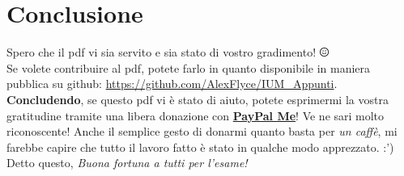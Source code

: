 \documentclass[oneside]{book}
\begin{document}
\chapter{Conclusione}
	Spero che il pdf vi sia servito e sia stato di vostro gradimento! \includegraphics[height = 3mm]{images/smile.png} \\

	Se volete contribuire al pdf, potete farlo in quanto disponibile in maniera pubblica su github: \url{https://github.com/AlexFlyce/IUM_Appunti}. \\


	\textbf{Concludendo}, se questo pdf vi è stato di aiuto, potete esprimermi la vostra gratitudine tramite una libera donazione con \href{https://www.paypal.me/alexflyce}{\textbf{PayPal Me}}! Ve ne sari molto riconoscente! Anche il semplice gesto di donarmi quanto basta per \emph{un caffè}, mi farebbe capire che tutto il lavoro fatto è stato in qualche modo apprezzato. :') \\

	Detto questo, \emph{Buona fortuna a tutti per l'esame!}
\end{document}
